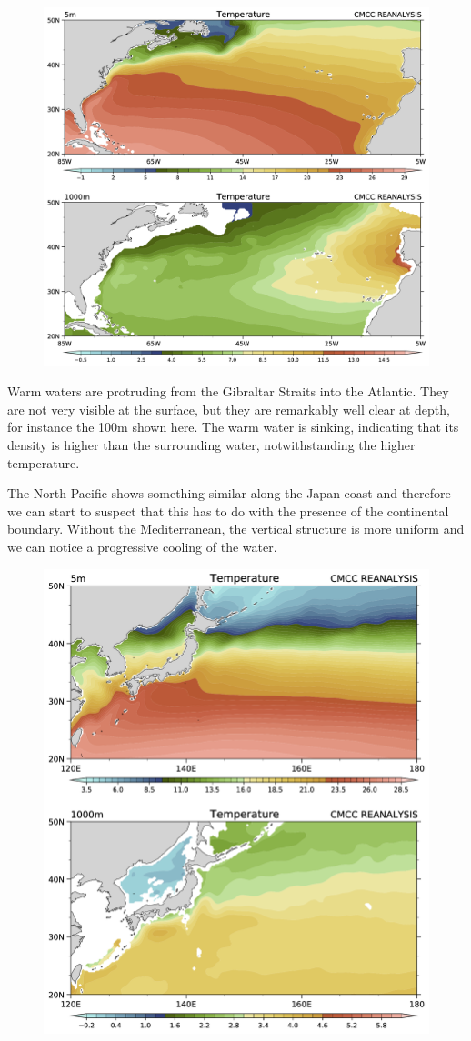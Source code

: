 \begin{figure}
\centering
\includegraphics[width = .7 \textwidth]{figs/GD/Gulf1000.png}
\caption{} \label{fig:}
\end{figure}

Warm waters are protruding from the Gibraltar Straits into the Atlantic.
They are not very visible at the surface, but they are remarkably well
clear at depth, for instance the 100m shown here. The warm water is
sinking, indicating that its density is higher than the surrounding
water, notwithstanding the higher temperature.

The North Pacific shows something similar along the Japan coast and
therefore we can start to suspect that this has to do with the presence
of the continental boundary. Without the Mediterranean, the vertical
structure is more uniform and we can notice a progressive cooling of the
water.

\begin{figure}
\centering
\includegraphics[width = .7 \textwidth]{figs/GD/Kur1000.png}
\caption{} \label{fig:}
\end{figure}

